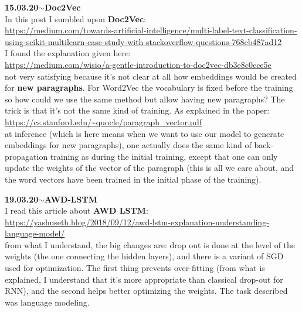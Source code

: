 \documentclass[11pt,a4paper]{article}
\newenvironment{loggentry}[2]%
{\noindent\textbf{#1}\hspace{1cm}$\mathbf{\sim}$\text{ }\textbf{#2}\\}{\vspace{0.5cm}}
\begin{document}
\begin{loggentry}{15.03.20}{Doc2Vec}

In this post I sumbled upon \textbf{Doc2Vec}:\\
\url{https://medium.com/towards-artificial-intelligence/multi-label-text-classification-using-scikit-multilearn-case-study-with-stackoverflow-questions-768cb487ad12}\\
I found the explanation given here:\\
\url{https://medium.com/wisio/a-gentle-introduction-to-doc2vec-db3e8c0cce5e}\\
not very satisfying because it's not clear at all how embeddings would be created for \textbf{new paragraphs}. For Word2Vec the vocabulary is fixed before the training so how could we use the same method but allow having new paragraphs? The trick is that it's not the same kind of training. As explained in the paper:\\
\url{https://cs.stanford.edu/~quocle/paragraph_vector.pdf}\\
at inference (which is here means when we want to use our model to generate embeddings for new paragraphs), one actually does the same kind of back-propagation training as during the initial training, except that one can only update the weights of the vector of the paragraph (this is all we care about, and the word vectors have been trained in the initial phase of the training).

\end{loggentry}


\begin{loggentry}{19.03.20}{AWD-LSTM}

I read this article about \textbf{AWD LSTM}:\\
\url{https://yashuseth.blog/2018/09/12/awd-lstm-explanation-understanding-language-model/}\\

from what I understand, the big changes are: drop out is done at the level of the weights (the one connecting the hidden layers), and there is a variant of SGD used for optimization. The first thing prevents over-fitting (from what is explained, I understand that it's more appropriate than classical drop-out for RNN), and the second helps better optimizing the weights. The task described was language modeling.

\end{loggentry}
\end{document}
